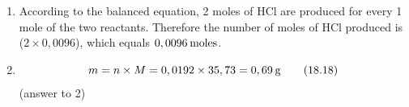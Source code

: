 {\begin{mdframed}[linewidth=4, leftmargin=40, rightmargin=40]
\begin{exercise}
\begin{enumerate}[noitemsep, label=\textbf{Step} \textbf{\arabic*}. ]
    \begin{equation}
    m=n\ensuremath{\times}M=0,0096\ensuremath{\times}98,086=0,94\phantom{\rule{2pt}{0ex}}\mathrm{g}\tag{18.17}
      \end{equation}
      \label{m38717*id279505}(answer to 1)\par 
      \item  
      \label{m38717*id279513}According to the balanced equation, 2 moles of $\mathrm{HCl}$ are produced for every 1 mole of the two reactants. Therefore the number of moles of $\mathrm{HCl}$ produced is ($2\ensuremath{\times}0,0096$), which equals $0,0096\phantom{\rule{2pt}{0ex}}\mathrm{moles}$.\par 
      \item  
      \label{m38717*id279531}\nopagebreak\noindent{}
        
    \begin{equation}
    m=n\ensuremath{\times}M=0,0192\ensuremath{\times}35,73=0,69\phantom{\rule{2pt}{0ex}}\mathrm{g}\tag{18.18}
      \end{equation}
      \label{m38717*id279580}(answer to 2)\par 
\end{enumerate}
    \end{exercise}
    \end{mdframed}
    }
    \noindent
\label{m38717*secfhsst!!!underscore!!!id832}
